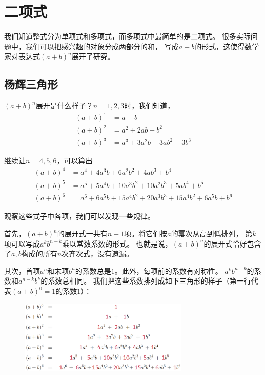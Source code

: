 \documentclass[12pt,UTF8]{ctexbook}
\begin{document}
\chapter{二项式}

我们知道整式分为单项式和多项式，而多项式中最简单的是二项式。
很多实际问题中，我们可以把感兴趣的对象分成两部分的和，
写成$a+b$的形式，这使得数学家对表达式$(a+b)^n$展开了研究。

\section{杨辉三角形}

$(a+b)^n$展开是什么样子？$n=1,2,3$时，我们知道，
\begin{align*}
 (a + b)^1 &= a + b  \\
 (a + b)^2 &= a^2 + 2ab + b^2  \\
 (a + b)^3 &= a^3 + 3a^2b + 3ab^2 + 3b^3  
\end{align*}

继续让$n=4,5,6$，可以算出
\begin{align*}
 (a + b)^4 &= a^4 + 4a^3b + 6a^2b^2 + 4ab^3 + b^4  \\
 (a + b)^5 &= a^5 + 5a^4b + 10a^3b^2 + 10a^2b^3 + 5ab^4 + b^5  \\
 (a + b)^6 &= a^6 + 6a^5b + 15a^4b^2 + 20a^3b^3 + 15a^4b^2 + 6a^5b + b^6  
\end{align*}

观察这些式子中各项，我们可以发现一些规律。

首先，$(a+b)^n$的展开式一共有$n+1$项。将它们按$a$的幂次从高到低排列，
第$k$项可以写成$a^kb^{n-k}$乘以常数系数的形式。
也就是说，$(a+b)^n$的展开式恰好包含了$a,b$构成的所有$n$次齐次式，没有遗漏。

其次，首项$a^n$和末项$b^n$的系数总是$1$。此外，每项前的系数有对称性。
$a^kb^{n-k}$的系数和$a^{n-k}b^k$的系数总相同。
我们把这些系数排列成如下三角形的样子（第一行代表$(a+b)^0=1$的系数$1$）：

\begin{figure}[h] %
    \vspace{-4pt}
    \centering
    \includegraphics[width=0.72\textwidth]{tu/二项式1.png}
\end{figure}
\end{document}

